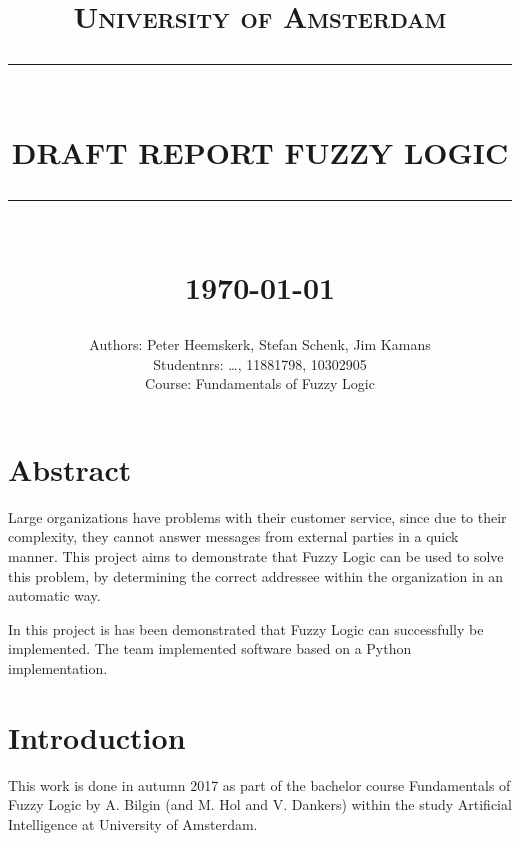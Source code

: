 \documentclass[a4paper]{article}
\newcommand{\HRule}[1]{\rule{\linewidth}{#1}}
\begin{document}
\title{ \normalsize \textsc{University of Amsterdam}
    \\ [2.0cm]
    \HRule{0.5pt} \\
    \LARGE \textbf{\uppercase{Draft Report Fuzzy Logic}}
    \HRule{2pt} \\ [0.5cm]
    \normalsize \today \vspace*{5\baselineskip}}

\date{}

\author{
    Authors: Peter Heemskerk, Stefan Schenk, Jim Kamans \\
    Studentnrs: \dots, 11881798, 10302905 \\
        Course: Fundamentals of Fuzzy Logic}

\maketitle
\newpage

\tableofcontents
\newpage

\sectionfont{\scshape}

\section{Abstract}

Large organizations have problems with their customer service, since due to their complexity, they cannot answer messages from external parties in a quick manner. This project aims to demonstrate that Fuzzy Logic can be used to solve this problem, by determining the correct addressee within the organization in an automatic way.

In this project is has been demonstrated that Fuzzy Logic can successfully be implemented. The team implemented software based on a Python implementation. 

\section{Introduction}

This work is done in autumn 2017 as part of the bachelor course Fundamentals of Fuzzy Logic by A. Bilgin (and  M. Hol and V. Dankers) within the study Artificial Intelligence at University of Amsterdam.  
\end{document}
